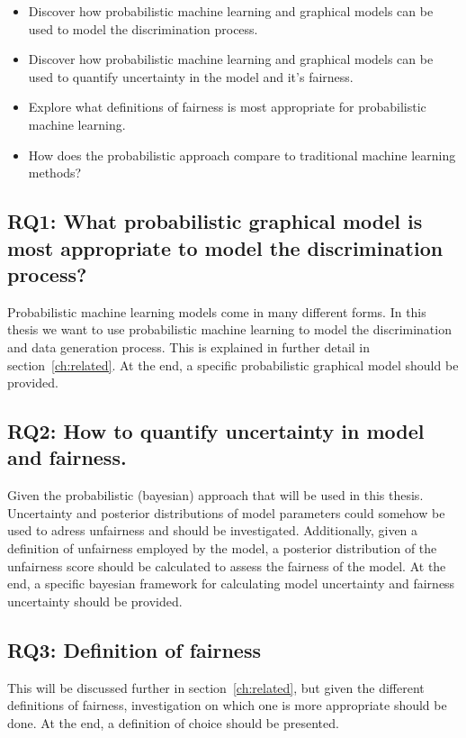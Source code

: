 \begin{itemize}
    \item Discover how probabilistic machine learning and graphical models can be used to model the discrimination process.
    \item Discover how probabilistic machine learning and graphical models can be used to quantify uncertainty in the model and it's fairness.
    \item Explore what definitions of fairness is most appropriate for probabilistic machine learning.
    \item How does the probabilistic approach compare to traditional machine learning methods?
\end{itemize}

\subsection{RQ1: What probabilistic graphical model is most appropriate to model the discrimination process?}

Probabilistic machine learning models come in many different forms. In this thesis we want to use probabilistic machine learning to model the discrimination and data generation process. This is explained in further detail in section~\ref{ch:related}. At the end, a specific probabilistic graphical model should be provided.

\subsection{RQ2: How to quantify uncertainty in model and fairness.}

Given the probabilistic (bayesian) approach that will be used in this thesis. Uncertainty and posterior distributions of model parameters could somehow be used to adress unfairness and should be investigated. Additionally, given a definition of unfairness employed by the model, a posterior distribution of the unfairness score should be calculated to assess the fairness of the model. At the end, a specific bayesian framework for calculating model uncertainty and fairness uncertainty should be provided.

\subsection{RQ3: Definition of fairness}

This will be discussed further in section~\ref{ch:related}, but given the different definitions of fairness, investigation on which one is more appropriate should be done. At the end, a definition of choice should be presented.

